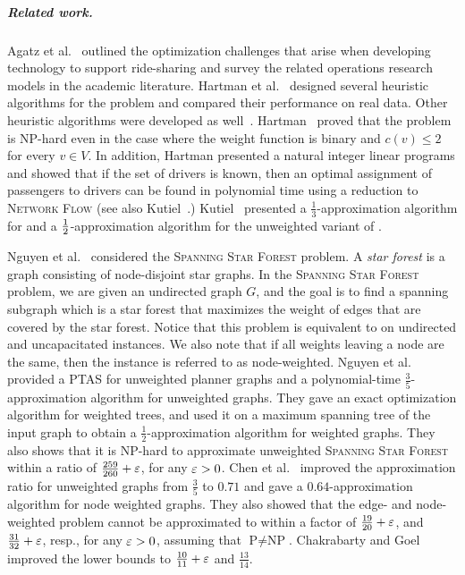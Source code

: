 
\subparagraph{Related work.}
%
Agatz et al.~\cite{agatz2012optimization} outlined the optimization
challenges that arise when developing technology to support
ride-sharing and survey the related operations research models in the
academic literature.
%
Hartman et al.~\cite{hartman2014theory} designed
several heuristic algorithms for the \carpool problem and compared
their performance on real data.  Other heuristic algorithms were
developed as well~\cite{knapen2014exploiting}.
%
Hartman~\cite{hartman2013optimal} proved that the \carpool problem is
NP-hard even in the case where the weight function is binary and
$c(v) \leq 2$ for every $v \in V$.  In addition, Hartman presented a
natural integer linear programs and showed that if the set of drivers
is known, then an optimal assignment of passengers to drivers can be
found in polynomial time using a reduction to \textsc{Network Flow}
(see also Kutiel~\cite{kutiel2016}.)
%
Kutiel~\cite{kutiel2016} presented a $\frac{1}{3}$-approximation
algorithm for \carpool and a $\frac{1}{2}$-approximation algorithm for the
unweighted variant of \carpool.

Nguyen et al.~\cite{nguyen2008approximating} considered
the \textsc{Spanning Star Forest} problem.  A \emph{star forest} is a
graph consisting of node-disjoint star graphs.  In
the \textsc{Spanning Star Forest} problem, we are given an undirected
graph $G$, and the goal is to find a spanning subgraph which is a star
forest that maximizes the weight of edges that are covered by the star
forest.  Notice that this problem is equivalent to \carpool on
undirected and uncapacitated instances.  We also note that if all
weights leaving a node are the same, then the instance is referred to
as node-weighted.
%
Nguyen et al.~\cite{nguyen2008approximating} provided a PTAS for
unweighted planner graphs and a polynomial-time
$\frac{3}{5}$-approximation algorithm for unweighted graphs.  They
gave an exact optimization algorithm for weighted trees, and used it
on a maximum spanning tree of the input graph to obtain a
$\frac{1}{2}$-approximation algorithm for weighted graphs.  They also
shows that it is NP-hard to approximate unweighted \textsc{Spanning
Star Forest} within a ratio of $\frac{259}{260}+\varepsilon$, for any
$\varepsilon>0$.
%
%
Chen et al.~\cite{CENRRS13} improved the approximation ratio for
unweighted graphs from $\frac{3}{5}$ to $0.71$ and gave a
$0.64$-approximation algorithm for node weighted graphs.  They also
showed that the edge- and node-weighted problem cannot be approximated
to within a factor of $\frac{19}{20} + \varepsilon$, and $\frac{31}{32}
+ \varepsilon$, resp., for any $\varepsilon > 0$, assuming that
$\text{P} \neq \text{NP}$.
%
Chakrabarty and Goel~\cite{ChakrabartyGoel10} improved the lower bounds
to $\frac{10}{11} + \varepsilon$ and $\frac{13}{14}$.

